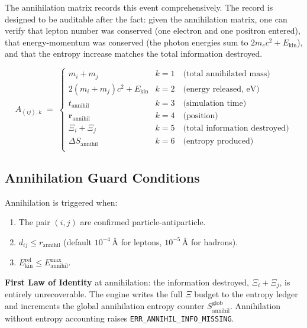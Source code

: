 \documentclass[11pt,a4paper]{article}
\newcommand{\Rec}{\Xi}
\newcommand{\rvec}{\mathbf{r}}
\newcommand{\ang}{\,\text{\AA}}
\begin{document}
The annihilation matrix records this event comprehensively.  The record is
designed to be auditable after the fact: given the annihilation matrix, one
can verify that lepton number was conserved (one electron and one positron
entered), that energy-momentum was conserved (the photon energies sum to
$2m_e c^2 + E_{\mathrm{kin}}$), and that the entropy increase matches the
total information destroyed.

\[
  A_{(ij),k} \;=\;
  \begin{cases}
    m_i + m_j               & k=1 \quad\text{(total annihilated mass)} \\
    2(m_i + m_j)c^2 + E_{\mathrm{kin}} & k=2 \quad\text{(energy released, eV)} \\
    t_{\mathrm{annihil}}    & k=3 \quad\text{(simulation time)} \\
    \rvec_{\mathrm{annihil}} & k=4 \quad\text{(position)} \\
    \Rec_i + \Rec_j          & k=5 \quad\text{(total information destroyed)} \\
    \Delta S_{\mathrm{annihil}} & k=6 \quad\text{(entropy produced)} \\
  \end{cases}
\]

\subsection{Annihilation Guard Conditions}

Annihilation is triggered when:
\begin{enumerate}[leftmargin=1.5em]
  \item The pair $(i, j)$ are confirmed particle-antiparticle.
  \item $d_{ij} \leq r_{\mathrm{annihil}}$ (default $10^{-4}\ang$ for
    leptons, $10^{-5}\ang$ for hadrons).
  \item $E_{\mathrm{kin}}^{\mathrm{rel}} \leq E_{\mathrm{annihil}}^{\mathrm{max}}$.
\end{enumerate}

\begin{smlaw}
\textbf{First Law of Identity} at annihilation: the information destroyed,
$\Rec_i + \Rec_j$, is entirely unrecoverable.  The engine writes the full
$\Rec$ budget to the entropy ledger and increments the global annihilation
entropy counter $S_{\mathrm{annihil}}^{\mathrm{glob}}$.  Annihilation without
entropy accounting raises \texttt{ERR\_ANNIHIL\_INFO\_MISSING}.
\end{smlaw}
\end{document}
